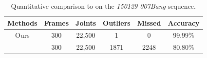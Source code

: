 \begin{table} [t]	
	\centering
	\caption{Quantitative comparison to \cite{Joo-15} on the \emph{150129 007Bang} sequence. }
	
	\begin{tabular}{c|c|c|c|c|c}
		\hline 
		{Methods} & {Frames} & {Joints} & {Outliers} & {Missed} & {Accuracy}\tabularnewline
		\hline 
		Ours & 300 & 22,500 & 1 & 0 & 99.99\% \tabularnewline
		\hline 
		\cite{Joo-15} & 300 & 22,500 & 1871 & 2248 & 80.80\% \tabularnewline
		\hline 
	\end{tabular} 
	\label{Table:iccvComparison}
\end{table}






